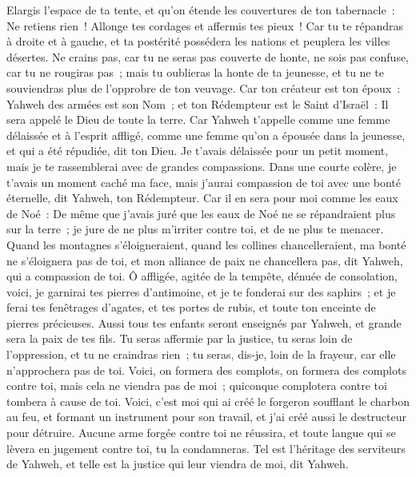 \begin{multicols}{2}
Elargis l'espace de ta tente, et qu'on étende les couvertures de ton tabernacle~: Ne retiens rien~! Allonge tes cordages et affermis tes pieux~!
Car tu te répandras à droite et à gauche, et ta postérité possédera les nations et peuplera les villes désertes.
Ne crains pas, car tu ne seras pas couverte de honte, ne sois pas confuse, car tu ne rougiras pas~; mais tu oublieras la honte de ta jeunesse, et tu ne te souviendras plus de l'opprobre de ton veuvage.
Car ton créateur est ton époux~: Yahweh des armées est son Nom~; et ton Rédempteur est le Saint d'Israël~: Il sera appelé le Dieu de toute la terre.
Car Yahweh t'appelle comme une femme délaissée et à l'esprit affligé, comme une femme qu'on a épousée dans la jeunesse, et qui a été répudiée, dit ton Dieu.
Je t'avais délaissée pour un petit moment, mais je te rassemblerai avec de grandes compassions.
Dans une courte colère, je t'avais un moment caché ma face, mais j'aurai compassion de toi avec une bonté éternelle, dit Yahweh, ton Rédempteur.
Car il en sera pour moi comme les eaux de Noé~: De même que j'avais juré que les eaux de Noé ne se répandraient plus sur la terre~; je jure de ne plus m'irriter contre toi, et de ne plus te menacer.
Quand les montagnes s'éloigneraient, quand les collines chancelleraient, ma bonté ne s'éloignera pas de toi, et mon alliance de paix ne chancellera pas, dit Yahweh, qui a compassion de toi.
Ô affligée, agitée de la tempête, dénuée de consolation, voici, je garnirai tes pierres d'antimoine, et je te fonderai sur des saphirs~;
et je ferai tes fenêtrages d'agates, et tes portes de rubis, et toute ton enceinte de pierres précieuses.
Aussi tous tes enfants seront enseignés par Yahweh, et grande sera la paix de tes fils.
Tu seras affermie par la justice, tu seras loin de l'oppression, et tu ne craindras rien~; tu seras, dis-je, loin de la frayeur, car elle n'approchera pas de toi.
Voici, on formera des complots, on formera des complots contre toi, mais cela ne viendra pas de moi~; quiconque complotera contre toi tombera à cause de toi.
Voici, c'est moi qui ai créé le forgeron soufflant le charbon au feu, et formant un instrument pour son travail, et j'ai créé aussi le destructeur pour détruire.
Aucune arme forgée contre toi ne réussira, et toute langue qui se lèvera en jugement contre toi, tu la condamneras. Tel est l'héritage des serviteurs de Yahweh, et telle est la justice qui leur viendra de moi, dit Yahweh.

\end{multicols}

